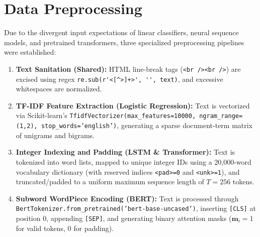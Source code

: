\section{Data Preprocessing}
Due to the divergent input expectations of linear classifiers, neural sequence models, and pretrained transformers, three specialized preprocessing pipelines were established:
\begin{enumerate}
    \item \textbf{Text Sanitation (Shared):} HTML line-break tags (\lstinline|<br /><br />|) are excised using regex \lstinline|re.sub(r'<[^>]+>', '', text)|, and excessive whitespaces are normalized.
    \item \textbf{TF-IDF Feature Extraction (Logistic Regression):} Text is vectorized via Scikit-learn's \texttt{TfidfVectorizer(max\_features=10000, ngram\_range=(1,2), stop\_words='english')}, generating a sparse document-term matrix of unigrams and bigrams.
    \item \textbf{Integer Indexing and Padding (LSTM \& Transformer):} Text is tokenized into word lists, mapped to unique integer IDs using a 20,000-word vocabulary dictionary (with reserved indices \lstinline|<pad>=0| and \lstinline|<unk>=1|), and truncated/padded to a uniform maximum sequence length of $T = 256$ tokens.
    \item \textbf{Subword WordPiece Encoding (BERT):} Text is processed through \texttt{BertTokenizer.from\_pretrained('bert-base-uncased')}, inserting \texttt{[CLS]} at position 0, appending \texttt{[SEP]}, and generating binary attention masks ($\mathbf{m}_i = 1$ for valid tokens, $0$ for padding).
\end{enumerate}

